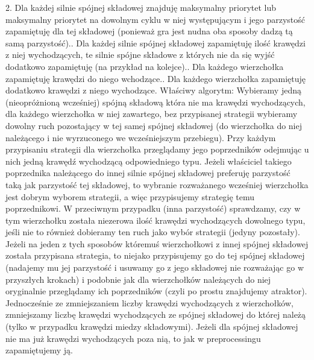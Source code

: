\documentclass{article}
\begin{document}
2. Dla każdej silnie spójnej składowej znajduję maksymalny priorytet
lub maksymalny priorytet na dowolnym cyklu w niej występującym i jego parzystość zapamiętuję dla tej składowej
(ponieważ gra jest nudna oba sposoby dadzą tą samą parzystość).. Dla każdej silnie spójnej składowej zapamiętuję ilość krawędzi z niej wychodzących,
te silnie spójne składowe z których nie da się wyjść dodatkowo zapamiętuję (na przykład na kolejce).. Dla każdego wierzchołka zapamiętuję krawędzi do niego wchodzące.. Dla każdego wierzchołka zapamiętuję dodatkowo krawędzi z niego wychodzące.\newline
\newline
Właściwy algorytm:\newline
Wybieramy jedną (nieopróżnioną wcześniej) spójną składową która nie ma krawędzi wychodzących, dla każdego wierzchołka w niej zawartego,
bez przypisanej strategii wybieramy dowolny ruch pozostający w tej samej spójnej składowej
(do wierzchołka do niej należącego i nie wyrzuconego we wcześniejszym przebiegu).
Przy każdym przypisaniu strategii dla wierzchołka przeglądamy jego poprzedników odejmując u nich jedną krawędź
wychodzącą odpowiedniego typu. Jeżeli właściciel takiego poprzednika należącego do innej silnie spójnej składowej
preferuję parzystość taką jak parzystość tej składowej,
to wybranie rozważanego wcześniej wierzchołka jest dobrym wyborem strategii, a więc przypisujemy strategię temu poprzednikowi.
W przeciwnym przypadku (inna parzystość) sprawdzamy, czy w tym wierzchołku została niezerowa ilość krawędzi wychodzących
dowolnego typu, jeśli nie to również dobieramy ten ruch jako wybór strategii (jedyny pozostały).
Jeżeli na jeden z tych sposobów któremuś wierzchołkowi z innej spójnej składowej została przypisana strategia,
to niejako przypisujemy go do tej spójnej składowej (nadajemy mu jej parzystość i usuwamy go z jego składowej nie rozważając go w przyszłych krokach)
i podobnie jak dla wierzchołków należących do niej oryginalnie przeglądamy ich poprzedników (czyli po prostu znajdujemy atraktor).\newline
Jednocześnie ze zmniejszaniem liczby krawędzi wychodzących z wierzchołków, zmniejszamy liczbę krawędzi wychodzących
ze spójnej składowej do której należą (tylko w przypadku krawędzi miedzy składowymi).
Jeżeli dla spójnej składowej nie ma już krawędzi wychodzących poza nią, to jak w preprocessingu zapamiętujemy ją.\newline
\end{document}

